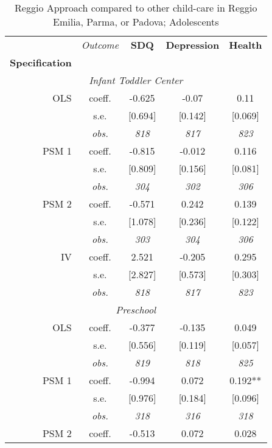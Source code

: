 \begin{table}[H] 
\caption{Reggio Approach compared to other child-care in Reggio Emilia, Parma, or Padova; Adolescents}
\label{tab:resultsAdo-all}
 \begin{centering} 
\vspace{1ex}
\begin{tabular}{ r c ccc} 
\hline \hline 
 & \textit{Outcome} & \textbf{SDQ}  & \textbf{Depression} & \textbf{Health}  \\ 
\textbf{Specification}  &  &  &  &  \\ 
\hline 
\multicolumn{5}{c}{\textit{Infant Toddler Center }} \\ 
\hline 

OLS	 & coeff.	 & -0.625	 & -0.07	 & 0.11	\\
	 & s.e.	 & [0.694]	 & [0.142]	 & [0.069]	\\
	 & \textit{obs.}	 & \textit{818}	 & \textit{817}	 & \textit{823}	\\
PSM 1	 & coeff.	 & -0.815	 & -0.012	 & 0.116	\\
	 & s.e.	 & [0.809]	 & [0.156]	 & [0.081]	\\
	 & \textit{obs.}	 & \textit{304}	 & \textit{302}	 & \textit{306}	\\
PSM 2	 & coeff.	 & -0.571	 & 0.242	 & 0.139	\\
	 & s.e.	 & [1.078]	 & [0.236]	 & [0.122]	\\
	 & \textit{obs.}	 & \textit{303}	 & \textit{304}	 & \textit{306}	\\
IV	 & coeff.	 & 2.521	 & -0.205	 & 0.295	\\
	 & s.e.	 & [2.827]	 & [0.573]	 & [0.303]	\\
	 & \textit{obs.}	 & \textit{818}	 & \textit{817}	 & \textit{823}	\\
\hline \multicolumn{5}{c}{\textit{Preschool }} \\ \hline
OLS	 & coeff.	 & -0.377	 & -0.135	 & 0.049	\\
	 & s.e.	 & [0.556]	 & [0.119]	 & [0.057]	\\
	 & \textit{obs.}	 & \textit{819}	 & \textit{818}	 & \textit{825}	\\
PSM 1	 & coeff.	 & -0.994	 & 0.072	 & 0.192**	\\
	 & s.e.	 & [0.976]	 & [0.184]	 & [0.096]	\\
	 & \textit{obs.}	 & \textit{318}	 & \textit{316}	 & \textit{318}	\\
PSM 2	 & coeff.	 & -0.513	 & 0.072	 & 0.028	\\

\end{tabular}
\end{centering}
\end{table}
